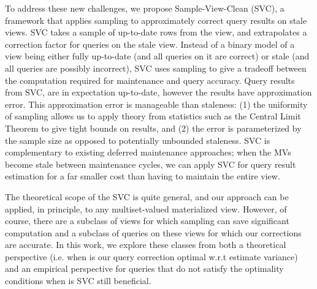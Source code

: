 To address these new challenges, we propose Sample-View-Clean (SVC), a framework that applies sampling to approximately correct query results on stale views.
SVC takes a sample of up-to-date rows from the view, and extrapolates a correction factor for queries on the stale view.
Instead of a binary model of a view being either fully up-to-date (and all queries on it are correct) or stale (and all queries are possibly incorrect), SVC uses sampling to give a tradeoff between the computation required for maintenance and query accuracy.
Query results from SVC, are in expectation up-to-date, however the results have approximation error.
This approximation error is manageable than staleness: (1) the uniformity of sampling allows us to apply theory from statistics such as the Central Limit Theorem to give tight bounds on results, and (2) the error is parameterized by the sample size as opposed to potentially unbounded staleness.
SVC is complementary to existing deferred maintenance approaches; when the MVs become stale between maintenance cycles, we can apply SVC for query result estimation for a far smaller cost than having to maintain the entire view.


The theoretical scope of the SVC is quite general, and our approach can be applied, in principle, to any multiset-valued materialized view.
However, of course, there are a subclass of views for which sampling can save significant computation and a subclass of queries on these views for which our corrections are accurate.
In this work, we explore these classes from both a theoretical perspective (i.e. when is our query correction optimal w.r.t estimate variance) and an empirical perspective for queries that do not satisfy the optimality conditions when is SVC still beneficial.

